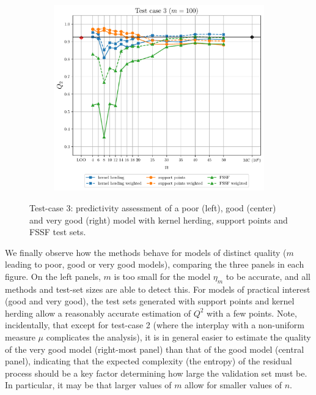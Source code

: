 \begin{landscape}
\begin{figure}
\begin{subfigure}[b]{0.32\linewidth}
        \end{subfigure}
        \centering
        \begin{subfigure}[b]{0.32\linewidth}
            \centering
            \includegraphics[width=\linewidth]{./part2/figures/SIS/gsobol_learnsize_100.pdf}
        \end{subfigure}
        \caption{Test-case 3: predictivity assessment of a poor (left), good (center) and very good (right) model with kernel herding, support points and FSSF test sets.}
        \label{fig:gsobol_benchmark}
    \end{figure}
\end{landscape}

We finally observe how the methods behave for models of distinct quality ($m$ leading to poor, good or very good models), comparing the three panels in each figure.
On the left panels, $m$ is too small for the model $\eta_m$ to be accurate, and all methods and test-set sizes are able to detect this.
For models of practical interest (good and very good), the test sets generated with support points and kernel herding allow a reasonably accurate estimation of $Q^2$ with a few points. Note, incidentally, that except for test-case 2 (where the interplay with a non-uniform measure $\mu$ complicates the analysis), it is in general easier to estimate the quality of the very good model (right-most panel) than that of the good model (central panel), indicating that the expected complexity (the entropy) of the residual process should be a key factor determining how large the validation set must be. In particular, it may be that larger values of $m$ allow for smaller values of $n$.





